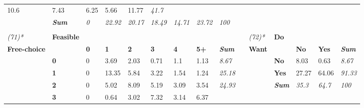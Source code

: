 \begin{table}
{\begin{threeparttable}
\begin{tabular}{lllllllllllllll}
  \cellcolor[HTML]{AFAFAF}10.6 &
  \cellcolor[HTML]{C7C7C7}7.43 &
  \cellcolor[HTML]{D0D0D0}6.25 &
  \cellcolor[HTML]{D5D5D5}5.66 &
  \cellcolor[HTML]{A6A6A6}11.77 &
  \textit{41.7} &
   &
   &
   &
   &
   &
  \textit{} \\
\textit{} &
  \textit{\textbf{Sum}} &
  \textit{0} &
  \textit{22.92} &
  \textit{20.17} &
  \textit{18.49} &
  \textit{14.71} &
  \textit{23.72} &
  \textit{100} &
  \textit{} &
  \textit{} &
  \textit{} &
  \textit{} &
  \textit{} &
  \textit{} \\
\textit{} &
  \textit{\textbf{}} &
  \textit{} &
  \textit{} &
  \textit{} &
  \textit{} &
  \textit{} &
  \textit{} &
  \textit{} &
  \textit{} &
  \textit{} &
  \textit{} &
  \textit{} &
  \textit{} &
  \textit{} \\
\textit{(71)*} &
  \textbf{Feasible} &
   &
   &
   &
   &
   &
   &
  \textit{} &
   &
  \textit{(72)*} &
  \textbf{Do} &
   &
   &
  \textit{} \\
\textbf{Free-choice} &
   &
  \textbf{0} &
  \textbf{1} &
  \textbf{2} &
  \textbf{3} &
  \textbf{4} &
  \textbf{5+} &
  \textit{\textbf{Sum}} &
  \textbf{} &
  \textbf{Want} &
   &
  \textbf{No} &
  \textbf{Yes} &
  \textit{\textbf{Sum}} \\
 &
  \textbf{0} &
  \cellcolor[HTML]{FFFFFF}0 &
  \cellcolor[HTML]{E7E7E7}3.69 &
  \cellcolor[HTML]{F2F2F2}2.03 &
  \cellcolor[HTML]{FBFBFB}0.71 &
  \cellcolor[HTML]{F8F8F8}1.1 &
  \cellcolor[HTML]{F8F8F8}1.13 &
  \textit{8.67} &
   &
   &
  \textbf{No} &
  \cellcolor[HTML]{F5F5F5}8.03 &
  \cellcolor[HTML]{FFFFFF}0.63 &
  \textit{8.67} \\
 &
  \textbf{1} &
  \cellcolor[HTML]{FFFFFF}0 &
  \cellcolor[HTML]{A6A6A6}13.35 &
  \cellcolor[HTML]{D9D9D9}5.84 &
  \cellcolor[HTML]{EAEAEA}3.22 &
  \cellcolor[HTML]{F5F5F5}1.54 &
  \cellcolor[HTML]{F7F7F7}1.24 &
  \textit{25.18} &
   &
   &
  \textbf{Yes} &
  \cellcolor[HTML]{DADADA}27.27 &
  \cellcolor[HTML]{A6A6A6}64.06 &
  \textit{91.33} \\
 &
  \textbf{2} &
  \cellcolor[HTML]{FFFFFF}0 &
  \cellcolor[HTML]{DEDEDE}5.02 &
  \cellcolor[HTML]{CACACA}8.09 &
  \cellcolor[HTML]{DDDDDD}5.19 &
  \cellcolor[HTML]{EBEBEB}3.09 &
  \cellcolor[HTML]{E8E8E8}3.54 &
  \textit{24.93} &
   &
   &
  \textit{\textbf{Sum}} &
  \textit{35.3} &
  \textit{64.7} &
  \textit{100} \\
 &
  \textbf{3} &
  \cellcolor[HTML]{FFFFFF}0 &
  \cellcolor[HTML]{FBFBFB}0.64 &
  \cellcolor[HTML]{EBEBEB}3.02 &
  \cellcolor[HTML]{CFCFCF}7.32 &
  \cellcolor[HTML]{EBEBEB}3.14 &
  \cellcolor[HTML]{D5D5D5}6.37 &

\end{tabular}
\end{threeparttable}}
\end{table}
